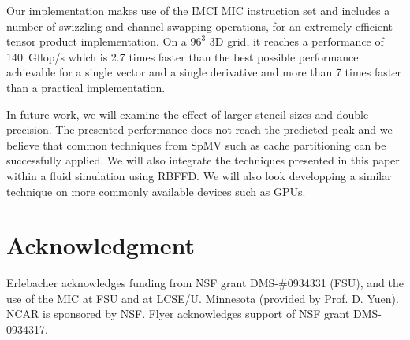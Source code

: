 \documentclass{sig-alternate}
\def\ee#1{{#1}}
\def\NOTE#1{{}}
\begin{document}
Our implementation makes use of the IMCI MIC instruction set and
includes a number of swizzling and channel swapping operations, for an
extremely efficient tensor product implementation. \NOTE{From Evan: this is the first time $96^3$ is mentionned. Might wish to mention it earlier.} On a $96^3$ 3D
grid, it reaches a performance of 140~Gflop/s which is 2.7 times
faster than the best possible performance achievable for a single
vector and a single derivative and more than 7 times faster than a
practical implementation.

In future work, we will examine the effect of larger stencil sizes and
double precision. The presented performance does not reach the
predicted peak and we believe that common techniques from SpMV such as
cache partitioning can be successfully applied. We will also integrate
the techniques presented in this paper within a fluid simulation using
RBFFD. \ee{We will also look developping a similar technique on more
commonly available devices such as GPUs.}

\section*{Acknowledgment}
Erlebacher acknowledges funding from NSF grant
DMS-\#0934331 (FSU), and the use of the MIC at FSU and at LCSE/U. Minnesota (provided by Prof. D. Yuen). NCAR is sponsored by NSF. 
Flyer acknowledges support of NSF grant DMS-0934317.



\end{document}
